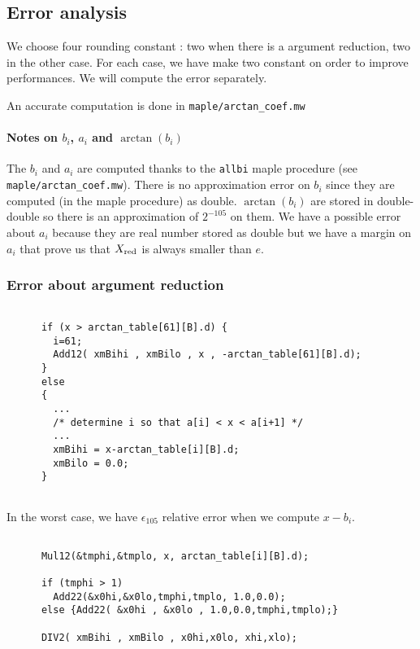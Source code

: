 \subsection{Error analysis}

We choose four rounding constant : two when there is a argument reduction, two in
the other case. For each case, we have make two constant on order to
improve performances. We will compute the error separately.

An accurate computation is done in \texttt{maple/arctan\_coef.mw} 

\paragraph{Notes on $b_i$, $a_i$ and $\arctan(b_i)$}
The $b_i$ and $a_i$ are computed thanks to the \texttt{allbi} maple
procedure (see \texttt{maple/arctan\_coef.mw}). There is no approximation
error on $b_i$ since they are computed (in the maple procedure) as
double. $\arctan (b_i)$ are stored in double-double so there is an
approximation of $2^{-105}$ on them. We have a possible error about $a_i$
because they are real number stored as double but we have a margin on $a_i$
that prove us that $X_{\mathrm{red}}$ is always smaller than $e$.

\subsubsection{Error about argument reduction}

\begin{lstlisting}[caption={Reduction part 1},firstnumber=1]

      if (x > arctan_table[61][B].d) {
        i=61;
        Add12( xmBihi , xmBilo , x , -arctan_table[61][B].d);
      }
      else
      {
        ...
        /* determine i so that a[i] < x < a[i+1] */
        ...          
        xmBihi = x-arctan_table[i][B].d;
        xmBilo = 0.0;
      }
      
\end{lstlisting}

In the worst case, we have $\epsilon_{105}$ relative error when we compute
$x-b_i$.

\begin{lstlisting}[caption={Reduction part 2},firstnumber=1]

      Mul12(&tmphi,&tmplo, x, arctan_table[i][B].d);

      if (tmphi > 1)
        Add22(&x0hi,&x0lo,tmphi,tmplo, 1.0,0.0);
      else {Add22( &x0hi , &x0lo , 1.0,0.0,tmphi,tmplo);}
      
      DIV2( xmBihi , xmBilo , x0hi,x0lo, xhi,xlo);

\end{lstlisting}

